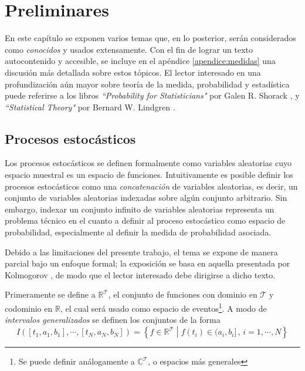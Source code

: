 \documentclass[12pt,letterpaper]{book}
\newcommand{\R}{\mathbb{R}}
\newcommand{\C}{\mathbb{C}}
\newcommand{\talque}{\mathrel{}\middle|\mathrel{}}
\begin{document}
\chapter{Preliminares}

En este capítulo se exponen varios temas que, en lo posterior, serán considerados como \textit{conocidos} y usados extensamente.
%
Con el fin de lograr un texto autocontenido y accesible, se incluye en el apéndice \ref{apendice:medidas} una discusión más detallada sobre estos tópicos.
%
El lector interesado en una profundización aún mayor sobre teoría de la medida, probabilidad y estadística puede referirse a los libros \textit{``Probability for Statisticians"} por Galen R. Shorack \cite{probabilidad_shorack}, y \textit{``Statistical Theory"} por Bernard W. Lindgren \cite{estadistica_lindgren}.


\section{Procesos estocásticos}

Los procesos estocásticos se definen formalmente como variables aleatorias cuyo espacio muestral es un espacio de funciones.
%
Intuitivamente es posible definir los procesos estocásticos como una \textit{concatenación} de variables aleatorias, es decir, un conjunto de variables aleatorias indexadas sobre algún conjunto arbitrario.
%
Sin embargo, indexar un conjunto infinito de variables aleatorias representa un problema técnico en el cuanto a definir al proceso estocástico como espacio de probabilidad, especialmente al definir la medida de probabilidad asociada.

Debido a las limitaciones del presente trabajo, el tema se expone de manera parcial bajo un enfoque formal; la exposición se basa en aquella presentada por Kolmogorov \cite{kolmogorov2018foundations}, de modo que el lector interesado debe dirigirse a dicho texto.

Primeramente se define a $\R^{\mathcal{T}}$, el conjunto de funciones con dominio en $\mathcal{T}$ y codominio en $\R$, el cual será usado como espacio de eventos\footnote{Se puede definir análogamente a $\C^{\mathcal{T}}$, o espacios más generales}. 
%
A modo de \textit{intervalos generalizados} se definen los conjuntos de la forma
\begin{equation}
I\left( [t_1, a_1, b_1], \cdots, [t_N, a_N, b_N] \right) = 
\left\{ f \in \R^{\mathcal{T}} \talque f(t_i) \in (a_i, b_i] \, , \, i = 1, \cdots, N \right\}
\end{equation}
\end{document}
